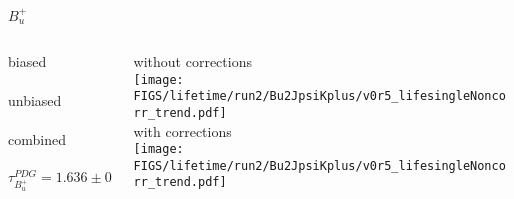 \begin{frame}{$B_u^+$}
  
  \begin{columns}
  
    \begin{column}{0.45\textwidth}
      {\color{scqorange}biased} \\[2mm]
      \resizebox{\textwidth}{!}{}\\[5mm]
      {\color{scqred}unbiased} \\[2mm]
      \resizebox{\textwidth}{!}{}\\[5mm]
      {\color{scqgreen}combined} \\[2mm]
      \resizebox{\textwidth}{!}{}\\
      \begin{equation*}
        \tau_{B_u^+}^{PDG} = 1.636 \pm 0.007
      \end{equation*}
    \end{column}
  
    \begin{column}{0.45\textwidth}
      \footnotesize
      {without corrections}\\[2mm]
      \texttt{[image: \\FIGS/lifetime/run2/Bu2JpsiKplus/v0r5\_lifesingleNoncorr\_trend.pdf]}\\[3mm]
      {with corrections}\\[2mm]
      \texttt{[image: \\FIGS/lifetime/run2/Bu2JpsiKplus/v0r5\_lifesingleNoncorr\_trend.pdf]}
    \end{column}
  
  \end{columns}

\end{frame}



